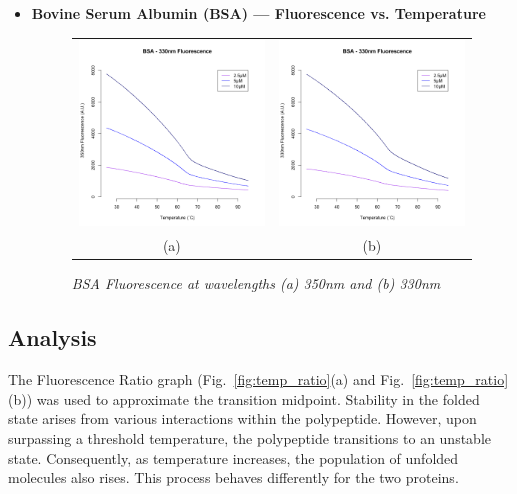 \documentclass[a4paper,10pt]{article}
\begin{document}
\begin{itemize}
                \item {\bfseries Bovine Serum Albumin (BSA) --- Fluorescence vs. Temperature}
                \begin{figure}[H]
                    \centering
                    \begin{tabular}{cc}
                        \includegraphics[width=200px]{../resources/unfolding_BSA_350.png} &
                        \includegraphics[width=200px]{../resources/unfolding_BSA_330.png} \\
                        (a) & (b)\\
                    \end{tabular}
                    \caption{\it BSA Fluorescence at wavelengths (a) 350nm and (b) 330nm}\label{fig:bsa_flr}
                \end{figure}
            \end{itemize}

        \subsection*{Analysis}
            The Fluorescence Ratio graph (Fig.~\ref{fig:temp_ratio}(a) and Fig.~\ref{fig:temp_ratio}(b)) was used to 
            approximate the transition midpoint. 
            Stability in the folded state arises from various interactions within the polypeptide. 
            However, upon surpassing a threshold temperature, the polypeptide 
            transitions to an unstable state. Consequently, as temperature increases, the population 
            of unfolded molecules also rises. This process behaves differently for the two proteins. 
\end{document}
